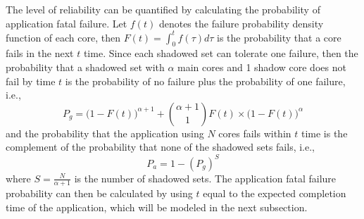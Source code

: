 The level of reliability can be quantified by calculating the probability of application fatal failure.
Let $f(t)$ denotes the failure probability density function of each core, then $F(t) = \int_0^tf(\tau)d\tau$ is the probability that a core fails in the next $t$ time. 
Since each shadowed set can tolerate one failure, 
then the probability that a shadowed set with $\alpha$ main cores and 1 shadow core does not fail by time $t$ is the probability of no failure plus the probability of one failure, i.e., 
\begin{equation}
	P_g = \Big(1-F(t)\Big)^{\alpha+1} + {{\alpha+1} \choose 1}F(t)\times \Big(1-F(t)\Big)^{\alpha}
\end{equation}
and the probability that the application using $N$ cores fails within $t$ time is the complement of the probability that
none of the shadowed sets fails, i.e.,
\begin{equation}
	P_a = 1 - ({P_g})^{S}
\end{equation}
where $S=\frac{N}{\alpha+1}$ is the number of shadowed sets.
The application fatal failure probability can then be calculated by using $t$ equal to the expected completion time of the application, which will be modeled in the next subsection.

